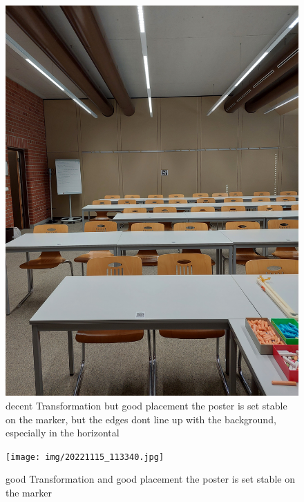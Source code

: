 \documentclass[a4paper,twocolumn]{article}
\begin{document}
    
    \begin{figure}[h!]
    \centering
    \includegraphics[width=0.9\columnwidth]{img/20221115_113328.jpg} %
    \caption{decent Transformation but good placement the poster is set stable on the marker, but the edges dont line up with the background, especially in the horizontal}
    \label{fig:20221115_113328.jpg}
    \end{figure}
    
    \begin{figure}[h!]
    \centering
    \texttt{[image: img/20221115\_113340.jpg]} %
    \caption{good Transformation and good placement the poster is set stable on the marker}
    \label{fig:20221115_113340.jpg}
    \end{figure}
    
\end{document}
